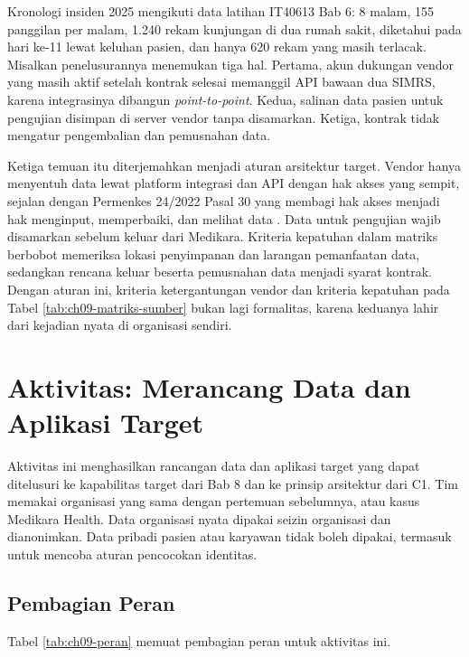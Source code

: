 \begin{kasus}[title={Kasus Medikara Health: Pelajaran dari Insiden Kebocoran Data lewat Vendor pada 2025}]
Kronologi insiden 2025 mengikuti data latihan IT40613 Bab 6: 8 malam, 155
panggilan per malam, 1.240 rekam kunjungan di dua rumah sakit, diketahui pada
hari ke-11 lewat keluhan pasien, dan hanya 620 rekam yang masih terlacak.
Misalkan penelusurannya menemukan tiga hal. Pertama, akun dukungan vendor yang
masih aktif setelah kontrak selesai memanggil API bawaan dua SIMRS, karena
integrasinya dibangun \textit{point-to-point}. Kedua, salinan
data pasien untuk pengujian disimpan di server vendor tanpa disamarkan.
Ketiga, kontrak tidak mengatur pengembalian dan pemusnahan data.

Ketiga temuan itu diterjemahkan menjadi aturan arsitektur target. Vendor
hanya menyentuh data lewat platform integrasi dan API dengan hak akses yang
sempit, sejalan dengan Permenkes 24/2022 Pasal 30 yang membagi hak akses
menjadi hak menginput, memperbaiki, dan melihat data \cite{permenkes24-2022}.
Data untuk pengujian wajib disamarkan sebelum keluar dari Medikara. Kriteria
kepatuhan dalam matriks berbobot memeriksa lokasi penyimpanan dan larangan
pemanfaatan data, sedangkan rencana keluar beserta pemusnahan data menjadi
syarat kontrak. Dengan aturan ini, kriteria ketergantungan vendor dan
kriteria kepatuhan pada Tabel \ref{tab:ch09-matriks-sumber} bukan lagi
formalitas, karena keduanya lahir dari kejadian nyata di organisasi sendiri.
\end{kasus}

\section{Aktivitas: Merancang Data dan Aplikasi Target}

Aktivitas ini menghasilkan rancangan data dan aplikasi target yang dapat
ditelusuri ke kapabilitas target dari Bab 8 dan ke prinsip arsitektur dari
C1. Tim memakai organisasi yang sama dengan pertemuan sebelumnya, atau kasus
Medikara Health. Data organisasi nyata dipakai seizin organisasi dan
dianonimkan. Data pribadi pasien atau karyawan tidak boleh dipakai, termasuk
untuk mencoba aturan pencocokan identitas.

\subsection*{Pembagian Peran}

Tabel \ref{tab:ch09-peran} memuat pembagian peran untuk aktivitas ini.

